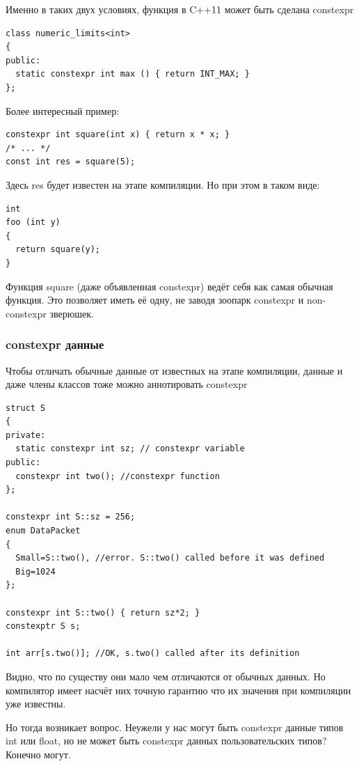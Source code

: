 \documentclass[a4paper,12pt,oneside]{article}
\begin{document}
Именно в таких двух условиях, функция в C++11 может быть сделана constexpr

\begin{lstlisting}
class numeric_limits<int>
{
public:
  static constexpr int max () { return INT_MAX; }
};
\end{lstlisting}

Более интересный пример:

\begin{lstlisting}
constexpr int square(int x) { return x * x; }
/* ... */
const int res = square(5);
\end{lstlisting}

Здесь res будет известен на этапе компиляции. Но при этом в таком виде:

\begin{lstlisting}
int
foo (int y)
{
  return square(y);
}
\end{lstlisting}

Функция square (даже объявленная constexpr) ведёт себя как самая обычная функция. Это позволяет иметь её одну, не заводя зоопарк constexpr и non-constexpr зверюшек.

\subsubsection{constexpr данные}

Чтобы отличать обычные данные от известных на этапе компиляции, данные и даже члены классов тоже можно аннотировать constexpr

\begin{lstlisting}
struct S
{
private:
  static constexpr int sz; // constexpr variable
public:
  constexpr int two(); //constexpr function
};

constexpr int S::sz = 256;
enum DataPacket
{
  Small=S::two(), //error. S::two() called before it was defined
  Big=1024
};

constexpr int S::two() { return sz*2; }
constexptr S s;

int arr[s.two()]; //OK, s.two() called after its definition
\end{lstlisting}

Видно, что по существу они мало чем отличаются от обычных данных. Но компилятор имеет насчёт них точную гарантию что их значения при компиляции уже известны.

Но тогда возникает вопрос. Неужели у нас могут быть constexpr данные типов int или float, но не может быть constexpr данных пользовательских типов? Конечно могут.
\end{document}

